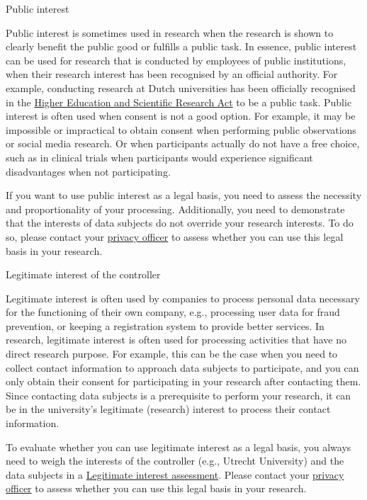 \documentclass[
]{book}
\begin{document}
Public interest

Public interest is sometimes used in research when the research is shown
to clearly benefit the public good or fulfills a public task. In
essence, public interest can be used for research that is conducted by
employees of public institutions, when their research interest has been
recognised by an official authority. For example, conducting research at
Dutch universities has been officially recognised in the
\href{https://wetten.overheid.nl/BWBR0005682/2022-01-01}{Higher Education and Scientific Research Act}
to be a public task. Public interest is often used when consent is not
a good option. For example, it may be impossible or impractical to
obtain consent when performing public observations or social media
research. Or when participants actually do not have a free choice, such
as in clinical trials when participants would experience significant
disadvantages when not participating.

If you want to use public interest as a legal basis, you
need to assess the necessity and proportionality of your processing.
Additionally, you need to demonstrate that the interests of data
subjects do not override your research interests. To do so, please contact
your \protect\hyperlink{support}{privacy officer} to assess whether you can use this
legal basis in your research.

Legitimate interest of the controller

Legitimate interest is often used by companies to process personal data
necessary for the functioning of their own company, e.g., processing
user data for fraud prevention, or keeping a registration system to
provide better services. In research, legitimate interest is often used
for processing activities that have no direct research purpose. For
example, this can be the case when you need to collect contact
information to approach data subjects to participate, and you can only
obtain their consent for participating in your research after contacting
them. Since contacting data subjects is a prerequisite to perform your
research, it can be in the university's legitimate (research) interest
to process their contact information.

To evaluate whether you can use legitimate interest as a legal basis, you
always need to weigh the interests of the controller (e.g., Utrecht
University) and the data subjects in a
\protect\hyperlink{legitimate-interest-assessment}{Legitimate interest assessment}.
Please contact your \protect\hyperlink{support}{privacy officer} to assess whether you
can use this legal basis in your research.
\end{document}
